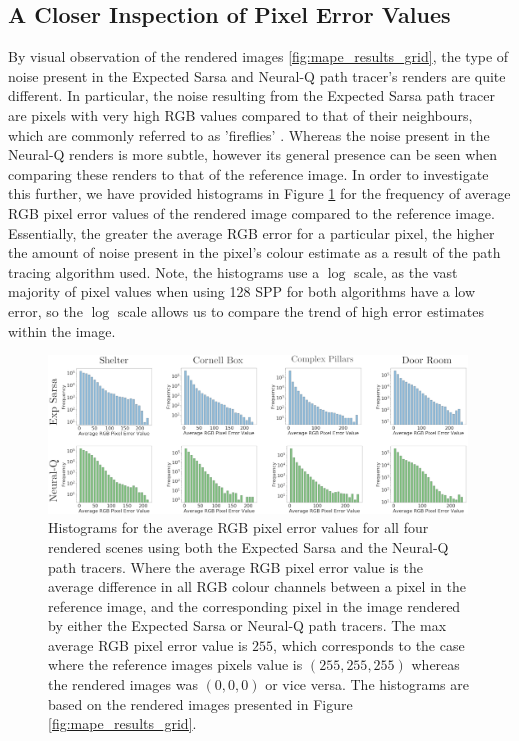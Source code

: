 \documentclass[../dissertation.tex]{subfiles}
\begin{document}
\pagebreak

\subsection{A Closer Inspection of Pixel Error Values}
\label{sec:close_inspec_pixels}

By visual observation of the rendered images \ref{fig:mape_results_grid}, the type of noise present in the Expected Sarsa and Neural-Q path tracer's renders are quite different. In particular, the noise resulting from the Expected Sarsa path tracer are pixels with very high RGB values compared to that of their neighbours, which are commonly referred to as 'fireflies'  \cite{christensen2016path}. Whereas the noise present in the Neural-Q renders is more subtle, however its general presence can be seen when comparing these renders to that of the reference image. In order to investigate this further, we have provided histograms in Figure \ref{fig:histogram_errors} for the frequency of average RGB pixel error values of the rendered image compared to the reference image. Essentially, the greater the average RGB error for a particular pixel, the higher the amount of noise present in the pixel's colour estimate as a result of the path tracing algorithm used. Note, the histograms use a $\log$ scale, as the vast majority of pixel values when using 128 SPP for both algorithms have a low error, so the $\log$ scale allows us to compare the trend of high error estimates within the image. 

\begin{figure}[h]
\begin{center}
\includegraphics[width=0.99\textwidth]{images/noise_diff.png}    
\end{center}
\caption{Histograms for the average RGB pixel error values for all four rendered scenes using both the Expected Sarsa and the Neural-Q path tracers. Where the average RGB pixel error value is the average difference in all RGB colour channels between a pixel in the reference image, and the corresponding pixel in the image rendered by either the Expected Sarsa or Neural-Q path tracers. The max average RGB pixel error value is $255$, which corresponds to the case where the reference images pixels value is $(255,255,255)$ whereas the rendered images was $(0,0,0)$ or vice versa. The histograms are based on the rendered images presented in Figure \ref{fig:mape_results_grid}.}
\label{fig:histogram_errors}
\end{figure}
\end{document}
